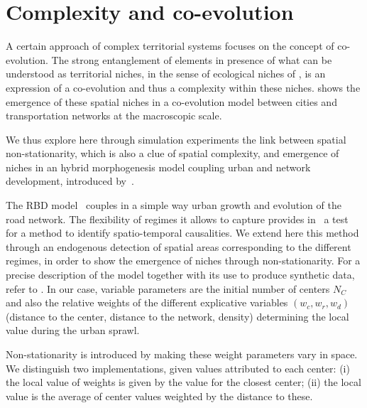 \documentclass[11pt]{article}
\begin{document}



\section{Complexity and co-evolution}



A certain approach of complex territorial systems focuses on the concept of co-evolution. The strong entanglement of elements in presence of what can be understood as territorial niches, in the sense of ecological niches of \cite{holland2012signals}, is an expression of a co-evolution and thus a complexity within these niches. \cite{raimbault2018modeling} shows the emergence of these spatial niches in a co-evolution model between cities and transportation networks at the macroscopic scale.


We thus explore here through simulation experiments the link between spatial non-stationarity, which is also a clue of spatial complexity, and emergence of niches in an hybrid morphogenesis model coupling urban and network development, introduced by~\cite{raimbault2014hybrid}.


The RBD model~\citep{raimbault2014hybrid} couples in a simple way urban growth and evolution of the road network. The flexibility of regimes it allows to capture provides in~\cite{raimbault2017identification} a test for a method to identify spatio-temporal causalities. We extend here this method through an endogenous detection of spatial areas corresponding to the different regimes, in order to show the emergence of niches through non-stationarity. For a precise description of the model together with its use to produce synthetic data, refer to \cite{raimbault2018caracterisation}. In our case, variable parameters are the initial number of centers $N_C$ and also the relative weights of the different explicative variables $(w_c,w_r,w_d)$ (distance to the center, distance to the network, density) determining the local value during the urban sprawl.



Non-stationarity is introduced by making these weight parameters vary in space. We distinguish two implementations, given values attributed to each center: (i) the local value of weights is given by the value for the closest center; (ii) the local value is the average of center values weighted by the distance to these.
\end{document}
